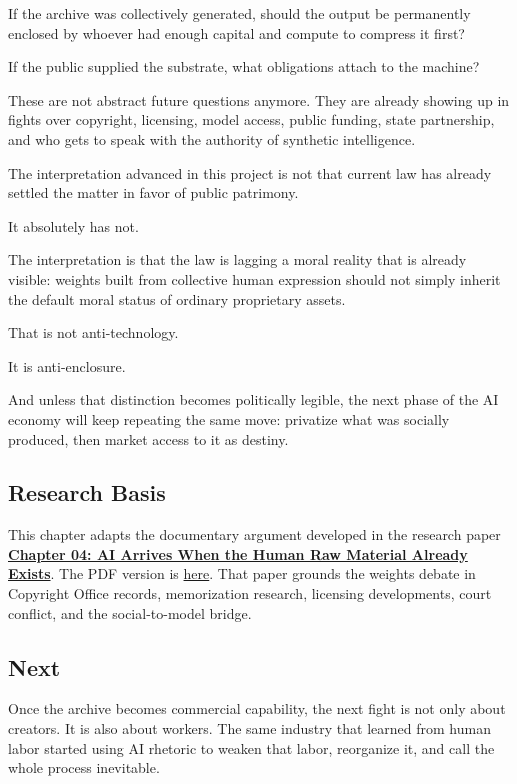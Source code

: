 \documentclass[
  american,
  12pt,
  letterpaper,
]{article}
\begin{document}
If the archive was collectively generated, should the output be
permanently enclosed by whoever had enough capital and compute to
compress it first?

If the public supplied the substrate, what obligations attach to the
machine?

These are not abstract future questions anymore. They are already
showing up in fights over copyright, licensing, model access, public
funding, state partnership, and who gets to speak with the authority of
synthetic intelligence.

The interpretation advanced in this project is not that current law has
already settled the matter in favor of public patrimony.

It absolutely has not.

The interpretation is that the law is lagging a moral reality that is
already visible: weights built from collective human expression should
not simply inherit the default moral status of ordinary proprietary
assets.

That is not anti-technology.

It is anti-enclosure.

And unless that distinction becomes politically legible, the next phase
of the AI economy will keep repeating the same move: privatize what was
socially produced, then market access to it as destiny.

\subsection{Research Basis}\label{research-basis}

This chapter adapts the documentary argument developed in the research
paper
\href{../../papers/html/04_data-models-weights_paper.html}{\textbf{Chapter
04: AI Arrives When the Human Raw Material Already Exists}}. The PDF
version is
\href{../../papers/pdf/04_data-models-weights_paper/04_data-models-weights_paper.pdf}{here}.
That paper grounds the weights debate in Copyright Office records,
memorization research, licensing developments, court conflict, and the
social-to-model bridge.

\subsection{Next}\label{next}

Once the archive becomes commercial capability, the next fight is not
only about creators. It is also about workers. The same industry that
learned from human labor started using AI rhetoric to weaken that labor,
reorganize it, and call the whole process inevitable.
\end{document}
